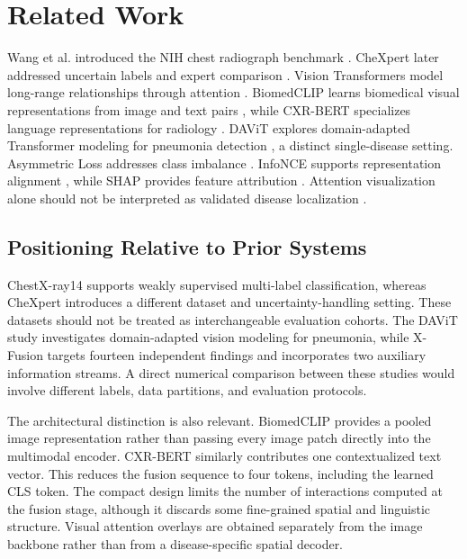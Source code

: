 \documentclass[pdflatex,sn-mathphys-num]{sn-jnl}
\begin{document}
\section{Related Work}

Wang et al. introduced the NIH chest radiograph benchmark \cite{wang2017}. CheXpert later addressed uncertain labels and expert comparison \cite{irvin2019}. Vision Transformers model long-range relationships through attention \cite{dosovitskiy2021,vaswani2017}. BiomedCLIP learns biomedical visual representations from image and text pairs \cite{biomedclip2023}, while CXR-BERT specializes language representations for radiology \cite{cxrbert2022}. DAViT explores domain-adapted Transformer modeling for pneumonia detection \cite{davit2025}, a distinct single-disease setting. Asymmetric Loss addresses class imbalance \cite{ridnik2021}. InfoNCE supports representation alignment \cite{oord2018}, while SHAP provides feature attribution \cite{lundberg2017}. Attention visualization alone should not be interpreted as validated disease localization \cite{chefer2021}.

\subsection{Positioning Relative to Prior Systems}

ChestX-ray14 supports weakly supervised multi-label classification, whereas CheXpert introduces a different dataset and uncertainty-handling setting. These datasets should not be treated as interchangeable evaluation cohorts. The DAViT study investigates domain-adapted vision modeling for pneumonia, while X-Fusion targets fourteen independent findings and incorporates two auxiliary information streams. A direct numerical comparison between these studies would involve different labels, data partitions, and evaluation protocols.

The architectural distinction is also relevant. BiomedCLIP provides a pooled image representation rather than passing every image patch directly into the multimodal encoder. CXR-BERT similarly contributes one contextualized text vector. This reduces the fusion sequence to four tokens, including the learned CLS token. The compact design limits the number of interactions computed at the fusion stage, although it discards some fine-grained spatial and linguistic structure. Visual attention overlays are obtained separately from the image backbone rather than from a disease-specific spatial decoder.
\end{document}
